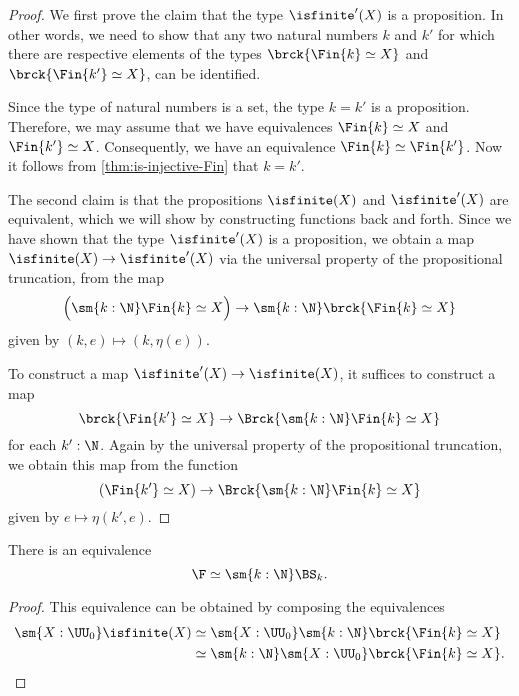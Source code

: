 \begin{proof}
  We first prove the claim that the type $\isfinite'(X)$ is a proposition. In other words, we need to show that any two natural numbers $k$ and $k'$ for which there are respective elements of the types $\brck{\Fin{k}\simeq X}$ and $\brck{\Fin{k'}\simeq X}$, can be identified.

  Since the type of natural numbers is a set, the type $k=k'$ is a proposition. Therefore, we may assume that we have equivalences $\Fin{k}\simeq X$ and $\Fin{k'}\simeq X$. Consequently, we have an equivalence $\Fin{k}\simeq\Fin{k'}$. Now it follows from \cref{thm:is-injective-Fin} that $k=k'$.

  The second claim is that the propositions $\isfinite(X)$ and $\isfinite'(X)$ are equivalent, which we will show by constructing functions back and forth.
  Since we have shown that the type $\isfinite'(X)$ is a proposition, we obtain a map $\isfinite(X)\to\isfinite'(X)$ via the universal property of the propositional truncation, from the map
  \begin{equation*}
    \Big(\sm{k:\N}\Fin{k}\simeq X\Big)\to \sm{k:\N}\brck{\Fin{k}\simeq X}
  \end{equation*}
  given by $(k,e)\mapsto (k,\eta(e))$. 
  
  To construct a map $\isfinite'(X)\to\isfinite(X)$, it suffices to construct a map
  \begin{equation*}
    \brck{\Fin{k'}\simeq X}\to \Brck{\sm{k:\N}\Fin{k}\simeq X}
  \end{equation*}
  for each $k':\N$. Again by the universal property of the propositional truncation, we obtain this map from the function
  \begin{equation*}
    (\Fin{k'}\simeq X) \to \Brck{\sm{k:\N}\Fin{k}\simeq X}
  \end{equation*}
  given by $e\mapsto \eta(k',e)$. 
\end{proof}

\begin{cor}
  There is an equivalence
  \begin{equation*}
    \F \simeq \sm{k:\N}\BS_k.
  \end{equation*}
\end{cor}

\begin{proof}
  This equivalence can be obtained by composing the equivalences
  \begin{align*}
    \sm{X:\UU_0}\isfinite(X) & \simeq \sm{X:\UU_0}\sm{k:\N}\brck{\Fin{k}\simeq X} \\
    & \simeq \sm{k:\N}\sm{X:\UU_0}\brck{\Fin{k}\simeq X}. \qedhere
  \end{align*}
\end{proof}

